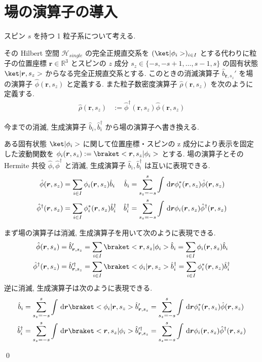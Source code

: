 \documentclass[uplatex,dvipdfmx,a4paper,11pt]{jlreq}
\makeatletter
\newcommand{\RR}{\mathbb{R}}
\newcommand{\HH}{\mathcal{H}}
\newcommand{\rr}{\bm{r}}
\numberwithin{equation}{section}
\theoremstyle{definition}
\renewenvironment{proof}[1][\proofname]{\par
  \normalfont
  \topsep6\p@\@plus6\p@ \trivlist
  \item[\hskip\labelsep{\bfseries #1}\@addpunct{\bfseries}]\ignorespaces\quad\par
}{
  \qed\endtrivlist\@endpefalse
}
\renewcommand\proofname{証明}
\makeatother
\begin{document}
\section{場の演算子の導入}
\begin{definition}[場の演算子]
  スピン $s$ を持つ 1 粒子系について考える.

  その Hilbert 空間 $\HH_{single}$ の完全正規直交系を $(\ket|\phi_i>)_{i\in I}$ とする代わりに粒子の位置座標 $\rr\in\RR^3$ とスピンの $z$ 成分 $s_z\in\{-s,-s+1,\ldots,s-1,s\}$ の固有状態 $\ket|\rr, s_z>$ からなる完全正規直交系とする.
  このときの消滅演算子 $\hat{b}_{\rr,s_z}'$ を場の演算子 $\hat{\phi}(\rr, s_z)$ と定義する.
  また粒子数密度演算子 $\hat{\rho}(\rr, s_z)$ を次のように定義する.
  \begin{align}
    \hat{\rho}(\rr, s_z) & := \hat{\phi}^\dagger(\rr, s_z)\hat{\phi}(\rr, s_z)
  \end{align}
\end{definition}
今までの消滅, 生成演算子 $\hat{b}_i, \hat{b}_i^\dagger$ から場の演算子へ書き換える.
\begin{theorem}[Q21-81(i)(ii), Q21-82]
  ある固有状態 $\ket|\phi_i>$ に関して位置座標・スピンの z 成分により表示を固定した波動関数を $\phi_i(\rr, s_z) := \braket<\rr, s_z|\phi_i>$ とする.
  場の演算子とその Hermite 共役 $\hat{\phi}, \hat{\phi}^\dagger$ と消滅, 生成演算子 $\hat{b}_i, \hat{b}_i^\dagger$ は互いに表現できる.
  \begin{align}
    \hat{\phi}(\rr, s_z)         & = \sum_{i\in I}\phi_i(\rr, s_z)\hat{b}_i           & \hat{b}_i         & = \sum_{s_z = -s}^s\int\dl{\rr}\phi_i^*(\rr, s_z)\hat{\phi}(\rr, s_z)       \\
    \hat{\phi}^\dagger(\rr, s_z) & = \sum_{i\in I}\phi_i^*(\rr, s_z)\hat{b}_i^\dagger & \hat{b}_i^\dagger & = \sum_{s_z = -s}^s\int\dl{\rr}\phi_i(\rr, s_z)\hat{\phi}^\dagger(\rr, s_z)
  \end{align}
\end{theorem}
\begin{proof}
  まず場の演算子は消滅, 生成演算子を用いて次のように表現できる.
  \begin{align}
    \hat{\phi}(\rr, s_z)         & = \hat{b}_{\rr,s_z}' = \sum_{i\in I}\braket<\rr,s_z|\phi_i>\hat{b}_i = \sum_{i\in I}\phi_i(\rr, s_z)\hat{b}_i                                  \\
    \hat{\phi}^\dagger(\rr, s_z) & = \hat{b}_{\rr,s_z}^{\prime\dagger} = \sum_{i\in I}\braket<\phi_i|\rr,s_z>\hat{b}_i^\dagger = \sum_{i\in I}\phi_i^*(\rr, s_z)\hat{b}_i^\dagger
  \end{align}
  逆に消滅, 生成演算子は次のように表現できる.
  \begin{align}
    \hat{b}_i         & = \sum_{s_z = -s}^s\int\dl{\rr}\braket<\phi_i|\rr, s_z>\hat{b}_{\rr,s_z}' = \sum_{s_z = -s}^s\int\dl{\rr}\phi_i^*(\rr, s_z)\hat{\phi}(\rr, s_z)                      \\
    \hat{b}_i^\dagger & = \sum_{s_z = -s}^s\int\dl{\rr}\braket<\rr, s_z|\phi_i>\hat{b}_{\rr,s_z}^{\prime\dagger} = \sum_{s_z = -s}^s\int\dl{\rr}\phi_i(\rr, s_z)\hat{\phi}^\dagger(\rr, s_z)
  \end{align}
\end{proof}
\end{document}
